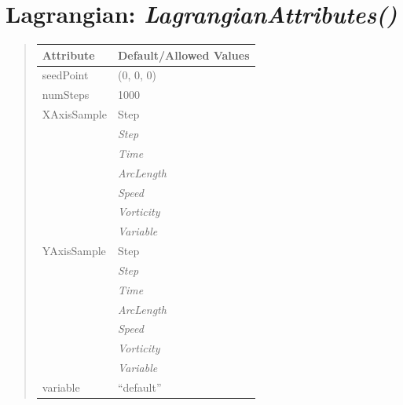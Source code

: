 \documentclass[letterpaper,10pt,english]{sphinxmanual}
\begin{document}
\begin{DUlineblock}{0em}
\item[] 
\end{DUlineblock}

\begin{DUlineblock}{0em}
\item[] 
\end{DUlineblock}


\section{\textbf{Lagrangian}: \emph{LagrangianAttributes()}}
\label{attributes:lagrangian-lagrangianattributes}
\begin{DUlineblock}{0em}
\item[] 
\end{DUlineblock}
\begin{quote}

\begin{tabulary}{\linewidth}{|L|L|}
\hline

\textbf{Attribute}
 & 
\textbf{Default/Allowed Values}
\\
\hline
seedPoint
 & 
(0, 0, 0)
\\
\hline
numSteps
 & 
1000
\\
\hline
XAxisSample
 & 
Step
\\
\hline & 
\emph{Step}
\\
\hline & 
\emph{Time}
\\
\hline & 
\emph{ArcLength}
\\
\hline & 
\emph{Speed}
\\
\hline & 
\emph{Vorticity}
\\
\hline & 
\emph{Variable}
\\
\hline
YAxisSample
 & 
Step
\\
\hline & 
\emph{Step}
\\
\hline & 
\emph{Time}
\\
\hline & 
\emph{ArcLength}
\\
\hline & 
\emph{Speed}
\\
\hline & 
\emph{Vorticity}
\\
\hline & 
\emph{Variable}
\\
\hline
variable
 & 
``default''
\\
\hline\end{tabulary}

\end{quote}

\begin{DUlineblock}{0em}
\item[] 
\end{DUlineblock}
\end{document}
